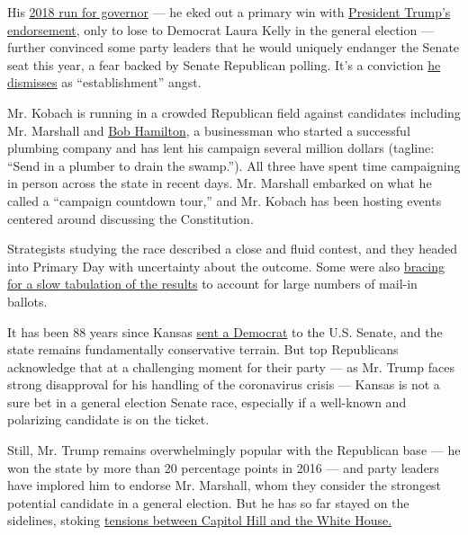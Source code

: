 His
\href{https://www.nytimes.com/2018/11/06/us/laura-kelly-wins-kansas-governors-race.html}{2018
run for governor} --- he eked out a primary win with
\href{https://www.nytimes.com/2018/08/06/us/politics/kris-kobach-trump-kansas.html}{President
Trump's endorsement}, only to lose to Democrat Laura Kelly in the
general election --- further convinced some party leaders that he would
uniquely endanger the Senate seat this year, a fear backed by Senate
Republican polling. It's a conviction
\href{https://www.nytimes.com/2020/07/30/us/politics/kansas-senate-kobach-trump.html}{he
dismisses} as ``establishment'' angst.

Mr. Kobach is running in a crowded Republican field against candidates
including Mr. Marshall and
\href{https://www.kansascity.com/news/politics-government/article244374532.html}{Bob
Hamilton}, a businessman who started a successful plumbing company and
has lent his campaign several million dollars (tagline: ``Send in a
plumber to drain the swamp.''). All three have spent time campaigning in
person across the state in recent days. Mr. Marshall embarked on what he
called a ``campaign countdown tour,'' and Mr. Kobach has been hosting
events centered around discussing the Constitution.

Strategists studying the race described a close and fluid contest, and
they headed into Primary Day with uncertainty about the outcome. Some
were also
\href{https://www.kansascity.com/news/politics-government/election/article244625722.html}{bracing
for a slow tabulation of the results} to account for large numbers of
mail-in ballots.

It has been 88 years since Kansas
\href{https://www.nytimes.com/2020/05/30/us/politics/kansas-senate-kobach.html}{sent
a Democrat} to the U.S. Senate, and the state remains fundamentally
conservative terrain. But top Republicans acknowledge that at a
challenging moment for their party --- as Mr. Trump faces strong
disapproval for his handling of the coronavirus crisis --- Kansas is not
a sure bet in a general election Senate race, especially if a well-known
and polarizing candidate is on the ticket.

Still, Mr. Trump remains overwhelmingly popular with the Republican base
--- he won the state by more than 20 percentage points in 2016 --- and
party leaders have implored him to endorse Mr. Marshall, whom they
consider the strongest potential candidate in a general election. But he
has so far stayed on the sidelines, stoking
\href{https://www.nytimes.com/2020/07/30/us/politics/kansas-senate-kobach-trump.html}{tensions
between Capitol Hill and the White House.}

